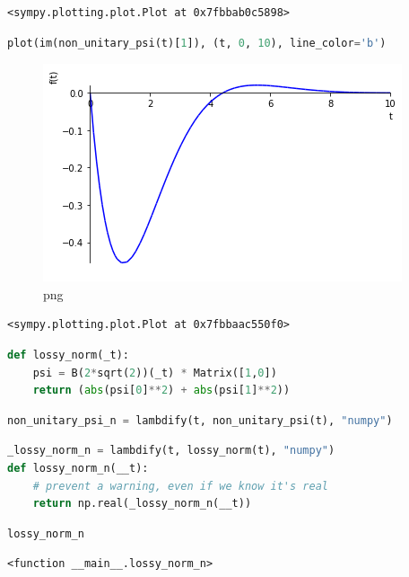 \begin{lstlisting}
<sympy.plotting.plot.Plot at 0x7fbbab0c5898>
\end{lstlisting}

\begin{lstlisting}[language=Python]
plot(im(non_unitary_psi(t)[1]), (t, 0, 10), line_color='b')
\end{lstlisting}

\begin{figure}
\centering
\includegraphics[width=0.66\linewidth]{output_21_0.png}
\caption[]{png}
\end{figure}

\begin{lstlisting}
<sympy.plotting.plot.Plot at 0x7fbbaac550f0>
\end{lstlisting}

\begin{lstlisting}[language=Python]
def lossy_norm(_t):
    psi = B(2*sqrt(2))(_t) * Matrix([1,0])
    return (abs(psi[0]**2) + abs(psi[1]**2))
\end{lstlisting}

\begin{lstlisting}[language=Python]
non_unitary_psi_n = lambdify(t, non_unitary_psi(t), "numpy")
\end{lstlisting}

\begin{lstlisting}[language=Python]
_lossy_norm_n = lambdify(t, lossy_norm(t), "numpy")
def lossy_norm_n(__t):
    # prevent a warning, even if we know it's real
    return np.real(_lossy_norm_n(__t))
\end{lstlisting}

\begin{lstlisting}[language=Python]
lossy_norm_n
\end{lstlisting}

\begin{lstlisting}
<function __main__.lossy_norm_n>
\end{lstlisting}

